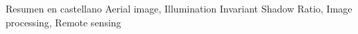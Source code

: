 Resumen en castellano
Aerial image, Illumination Invariant Shadow Ratio, Image processing, Remote sensing
